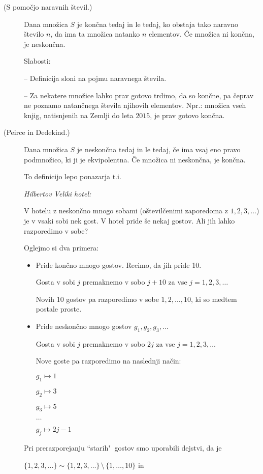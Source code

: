 \documentclass[11pt,paper=b5,footinclude,headinclude]{scrbook} %
\def\brez {{\,\setminus\,}}
\begin{document}
\begin{description}
  \item[(S pomočjo naravnih števil.)] Dana množica $S$ je končna tedaj in le tedaj, ko obstaja tako naravno število $n$, da ima ta množica natanko $n$ elementov. Če množica ni končna, je neskončna.

      Slabosti:

      -- Definicija sloni na pojmu naravnega števila.

      -- Za nekatere množice lahko prav gotovo trdimo, da so končne, pa čeprav ne poznamo natančnega števila njihovih elementov. Npr.: množica vseh knjig, natisnjenih na Zemlji do leta $2015$, je prav gotovo končna.

  \item[(Peirce in Dedekind.)] Dana množica $S$ je neskončna tedaj in le tedaj, če ima vsaj
  eno pravo podmnožico, ki ji je ekvipolentna. Če množica ni neskončna, je končna.

  \medskip
  To definicijo lepo ponazarja t.i.~{\em Hilbertov Veliki hotel:

  V hotelu z neskončno mnogo sobami (oštevilčenimi zaporedoma z $1,2,3,\ldots$) je v vsaki sobi nek gost. V hotel pride še nekaj gostov. Ali jih lahko razporedimo v sobe?}

  Oglejmo si dva primera:
\begin{itemize}
  \item {Pride končno mnogo gostov.} Recimo, da jih pride 10.

  Gosta v sobi $j$ premaknemo v sobo $j+10$ za vse $j = 1,2,3,\ldots$

  Novih 10 gostov pa razporedimo v sobe $1,2,\ldots, 10$, ki so medtem postale proste.

  \item {Pride neskončno mnogo gostov $g_1, g_2, g_3,\ldots$}

  Gosta v sobi $j$ premaknemo v sobo $2j$ za vse $j = 1,2,3,\ldots$

  Nove goste pa razporedimo na naslednji način:

  $g_1\mapsto 1$

  $g_2\mapsto 3$

  $g_3\mapsto 5$

  $\ldots$

  $g_j\mapsto 2j-1$
\end{itemize}


  Pri prerazporejanju ``starih"~gostov smo uporabili dejstvi, da je

  $\{1,2,3,\ldots\}\sim\{1,2,3,\ldots\}\brez\{1,\ldots,10\}$ in


\end{description}
\end{document}

